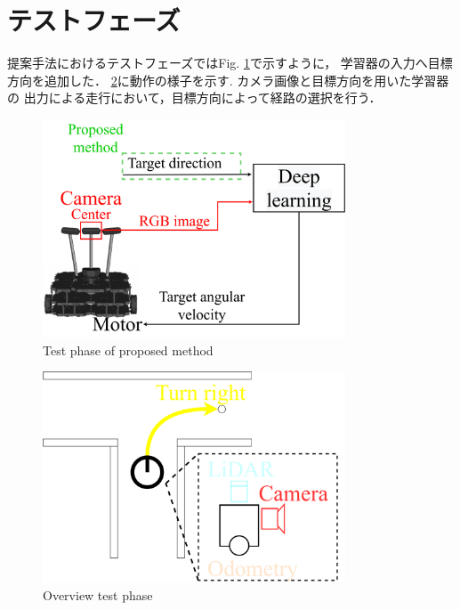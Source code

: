 \section{テストフェーズ}
\label{test}
提案手法におけるテストフェーズではFig. \ref{fig::testsystem}で示すように，
学習器の入力へ目標方向を追加した．
\ref{fig::test_abs}に動作の様子を示す.
カメラ画像と目標方向を用いた学習器の
出力による走行において，目標方向によって経路の選択を行う．


\begin{figure}[h]
    \centering
    \includegraphics[width = 9cm]{./figs/system_test.pdf}
    \caption{Test phase of proposed method}
    \label{fig::testsystem}
\end{figure}
\begin{figure}[h]
  \centering
  \includegraphics[width = 9cm]{./figs/test_abs.pdf}
  \caption{Overview test phase}
  \label{fig::test_abs}
\end{figure}

